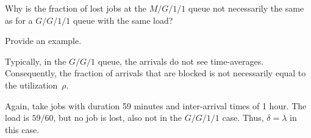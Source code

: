 \begin{exercise}
  Why is the fraction of lost jobs at the $M/G/1/1$ queue not
  necessarily the same as for a $G/G/1/1$ queue with the same load?  
  \begin{hint}
Provide an  example.
  \end{hint}
  \begin{solution}
 Typically, in the $G/G/1$ queue, the arrivals do not see  time-averages. Consequently, the fraction of arrivals that are blocked is not necessarily equal to the utilization~$\rho$.

  Again, take jobs with duration 59 minutes and inter-arrival times of
  1 hour. The load is $59/60$, but no job is lost, also not in the
  $G/G/1/1$ case. Thus, $\delta=\lambda$ in this case.
  \end{solution}
\end{exercise}


\begin{comment}
  
\begin{exercise}[use=false]
  Use the ideas of Section~\ref{sec:arrival-processes} to derive an
  expression for the density $f_r$ of the remaining service times as
  seen by the Poisson arrivals.  In the expression, check that it is a
  true density, in the sense that $\int_0^\infty f_r(x) \d x =1$.
  \begin{solution}
    \TBD.
  \end{solution}
\end{exercise}
\end{comment}













